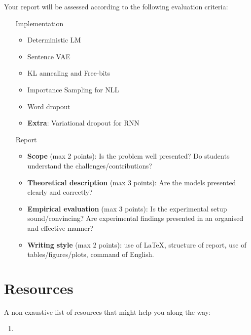 Your report will be assessed according to the following evaluation criteria:
\begin{enumerate}
	
	\item[Implementation]
	\begin{itemize}
	\item Deterministic LM
	\item Sentence VAE
	\item KL annealing and Free-bits
	\item Importance Sampling for NLL
	\item Word dropout
	\item \textbf{Extra}: Variational dropout for RNN
	\end{itemize}
	
	
	\item[Report]
	\begin{itemize}
	\item \textbf{Scope} (max 2 points): Is the problem well presented? Do students understand the challenges/contributions?
	\item \textbf{Theoretical description} (max 3 points): Are the models presented clearly and correctly?
	\item \textbf{Empirical evaluation} (max 3 points): Is the experimental setup sound/convincing? Are experimental findings presented in an organised and effective manner? 
	\item \textbf{Writing style} (max 2 points): use of \LaTeX , structure of report, use of tables/figures/plots, command of English.
	
	\end{itemize}
	
\end{enumerate}




\section{Resources}

A non-exaustive list of resources that might help you along the way:

\begin{enumerate}
	\item 
\end{enumerate}